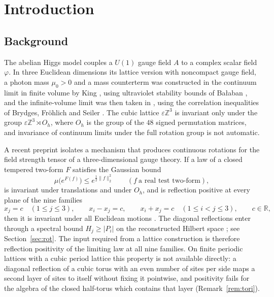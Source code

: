 \documentclass[11pt]{amsart}
\theoremstyle{plain}
\theoremstyle{definition}
\theoremstyle{remark}
\numberwithin{equation}{section}
\newcommand{\R}{\mathbb{R}}
\newcommand{\Z}{\mathbb{Z}}
\newcommand{\eps}{\varepsilon}
\newcommand{\Oh}{O_h}
\newcommand{\abs}[1]{\lvert #1\rvert}
\newcommand{\norm}[1]{\lVert #1\rVert}
\begin{document}
\tableofcontents

\section{Introduction}\label{sec:intro}

\subsection{Background}
The abelian Higgs model couples a $U(1)$ gauge field $A$ to a complex scalar field $\varphi$. In three Euclidean dimensions its lattice version with noncompact gauge field, a photon mass $\mu_0>0$ and a mass counterterm was constructed in the continuum limit in finite volume by King \cite{K1}, using ultraviolet stability bounds of Ba{\l}aban \cite{Ba1,Ba2,Ba3,Ba4}, and the infinite-volume limit was then taken in \cite{K2}, using the correlation inequalities of Brydges, Fr\"ohlich and Seiler \cite{BFS1}. The cubic lattice $\eps\Z^3$ is invariant only under the group $\eps\Z^3\rtimes\Oh$, where $\Oh$ is the group of the $48$ signed permutation matrices, and invariance of continuum limits under the full rotation group is not automatic.

A recent preprint \cite{S} isolates a mechanism that produces continuous rotations for the field strength tensor of a three-dimensional gauge theory. If a law of a closed tempered two-form $F$ satisfies the Gaussian bound
\begin{equation}\label{eq:G-intro}
\mu\big(e^{F(f)}\big)\le e^{\frac12\norm{f}_2^2}\qquad(f\ \text{a real test two-form}),
\end{equation}
is invariant under translations and under $\Oh$, and is reflection positive at every plane of the nine families
\begin{equation}\label{eq:nine}
x_j=c\quad(1\le j\le3),\qquad x_i-x_j=c,\qquad x_i+x_j=c\quad(1\le i<j\le3),\qquad c\in\R,
\end{equation}
then it is invariant under all Euclidean motions \cite[Thm.~18.21]{S}. The diagonal reflections enter through a spectral bound $H_j\ge\abs{P_i}$ on the reconstructed Hilbert space \cite[Prop.~18.1]{S}; see Section~\ref{sec:rot}. The input required from a lattice construction is therefore reflection positivity of the limiting law at all nine families. On finite periodic lattices with a cubic period lattice this property is not available directly: a diagonal reflection of a cubic torus with an even number of sites per side maps a second layer of sites to itself without fixing it pointwise, and positivity fails for the algebra of the closed half-torus which contains that layer (Remark~\ref{rem:tori}).
\end{document}

